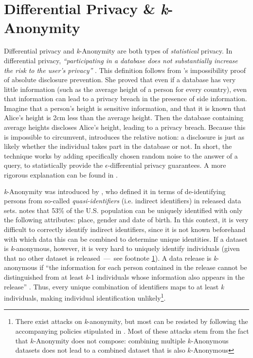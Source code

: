 \section{Differential Privacy \& \textit{k}-Anonymity}
\label{sec:statistical-privacy}
Differential privacy and \textit{k}-Anonymity are both types of \textit{statistical} privacy. In differential privacy, \textit{``participating in a database does not substantially increase the risk to the user's privacy''} \citep{diff-privacy}.  This definition follows from \citeauthor{diff-privacy}'s impossibility proof of absolute disclosure prevention. She proved that even if a database has very little information (such as the average height of a person for every country), even that information can lead to a privacy breach in the presence of side information. Imagine that a person's height is sensitive information, and that it is known that Alice's height is 2cm less than the average height. Then the database containing average heights discloses Alice's height, leading to a privacy breach. Because this is impossible to circumvent, \citeauthor{diff-privacy} introduces the relative notion: a disclosure is just as likely whether the individual takes part in the database or not. In short, the technique works by adding specifically chosen random noise to the answer of a query, to statistically provide the \textit{$\epsilon$}-differential privacy guarantees. A more rigorous explanation can be found in \citet[p9-11]{diff-privacy}.

\textit{k}-Anonymity was introduced by \citet{k-anonymity}, who defined it in terms of de-identifying persons from so-called \textit{quasi-identifiers} (i.e. indirect identifiers) in released data sets. \citet{demographics-identify-unique} notes that 53\% of the U.S. population can be uniquely identified with only the following attributes: place, gender and date of birth. In this context, it is very difficult to correctly identify indirect identifiers, since it is not known beforehand with which data this can be combined to determine unique identities. If a dataset is \textit{k}-anonymous, however, it is very hard to uniquely identify individuals (given that no other dataset is released \,---\, see footnote \ref{foot:k-anon-attacks}). A data release is \textit{k}-anonymous if ``the information for each person contained in the release cannot be distinguished from at least \textit{k}-1 individuals whose information also appears in the release'' \citep{k-anonymity}. Thus, every unique combination of identifiers maps to at least \textit{k} individuals, making individual identification unlikely\footnote{\label{foot:k-anon-attacks}There exist attacks on \textit{k}-anonymity, but most can be resisted by following the accompanying policies stipulated in \citet{k-anonymity}. Most of these attacks stem from the fact that $k$-Anonymity does not compose: combining multiple $k$-Anonymous datasets does not lead to a combined dataset that is also $k$-Anonymous}.

